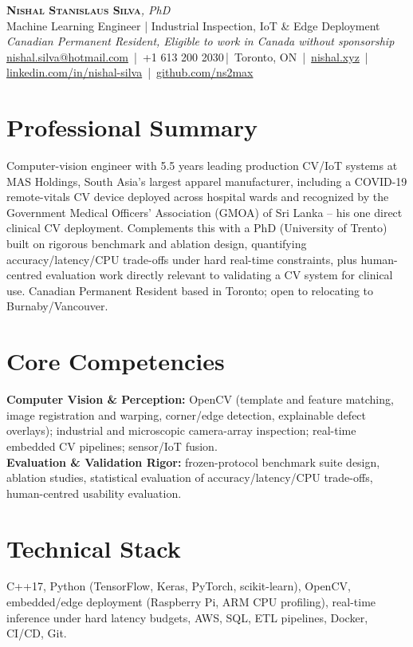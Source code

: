 \documentclass[11pt]{article}
\makeatletter
\newcommand{\cvName}{Nishal Stanislaus Silva}
\newcommand{\cvEmail}{nishal.silva@hotmail.com}
\newcommand{\cvPhone}{+1 613 200 2030}
\newcommand{\cvCity}{Toronto, ON}
\newcommand{\cvSite}{https://nishal.xyz}
\newcommand{\cvLinkedIn}{https://www.linkedin.com/in/nishal-silva}
\newcommand{\cvGitHub}{https://github.com/ns2max}
\newcommand{\cvStatus}{Canadian Permanent Resident, Eligible to work in Canada without sponsorship}
\newcommand{\cvTagline}{Machine Learning Engineer | Industrial Inspection, IoT \& Edge Deployment}
\makeatother
\begin{document}
\pagestyle{empty}
\begin{center}
    {\LARGE \scshape \textbf{\cvName}}{\large \textit{, PhD}}\\[1pt]
    {\small \cvTagline}\\[1pt]
    {\footnotesize\textit{\cvStatus}}\\[1pt]
    {\small
    \href{mailto:\cvEmail}{\cvEmail} \,|\, \cvPhone \,|\, \cvCity
    \,|\, \href{\cvSite}{nishal.xyz} \,|\, \href{\cvLinkedIn}{linkedin.com/in/nishal-silva}
    \,|\, \href{\cvGitHub}{github.com/ns2max}}
\end{center}

\section*{Professional Summary}
Computer-vision engineer with 5.5 years leading production CV/IoT systems at MAS Holdings, South Asia's largest apparel manufacturer, including a COVID-19 remote-vitals CV device deployed across hospital wards and recognized by the Government Medical Officers' Association (GMOA) of Sri Lanka -- his one direct clinical CV deployment. Complements this with a PhD (University of Trento) built on rigorous benchmark and ablation design, quantifying accuracy/latency/CPU trade-offs under hard real-time constraints, plus human-centred evaluation work directly relevant to validating a CV system for clinical use. Canadian Permanent Resident based in Toronto; open to relocating to Burnaby/Vancouver.

\section*{Core Competencies}
\textbf{Computer Vision \& Perception:} OpenCV (template and feature matching, image registration and warping, corner/edge detection, explainable defect overlays); industrial and microscopic camera-array inspection; real-time embedded CV pipelines; sensor/IoT fusion. \\
\textbf{Evaluation \& Validation Rigor:} frozen-protocol benchmark suite design, ablation studies, statistical evaluation of accuracy/latency/CPU trade-offs, human-centred usability evaluation.

\section*{Technical Stack}
C++17, Python (TensorFlow, Keras, PyTorch, scikit-learn), OpenCV, embedded/edge deployment (Raspberry Pi, ARM CPU profiling), real-time inference under hard latency budgets, AWS, SQL, ETL pipelines, Docker, CI/CD, Git.
\end{document}
